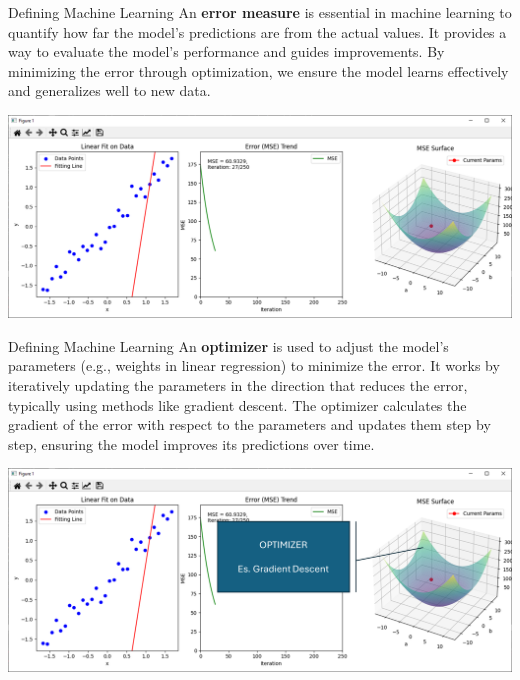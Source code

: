\documentclass[11pt]{beamer}
\begin{document}
\begin{frame}{Defining Machine Learning}
	\footnotesize{An \textbf{error measure} is essential in machine learning to quantify how far the model's predictions are from the actual values. It provides a way to evaluate the model's performance and guides improvements. By minimizing the error through optimization, we ensure the model learns effectively and generalizes well to new data. } 
	\begin{center}
	\includegraphics[scale=0.38]{../05-pictures/lesson-1-1_pic_3.png}
	\end{center}
\end{frame}
\begin{frame}{Defining Machine Learning}
	\footnotesize{An \textbf{optimizer} is used to adjust the model's parameters (e.g., weights in linear regression) to minimize the error. It works by iteratively updating the parameters in the direction that reduces the error, typically using methods like gradient descent. The optimizer calculates the gradient of the error with respect to the parameters and updates them step by step, ensuring the model improves its predictions over time. } 
	\begin{center}
	\includegraphics[scale=0.38]{../05-pictures/lesson-1-1_pic_4.png}
	\end{center}
\end{frame}
\end{document}
